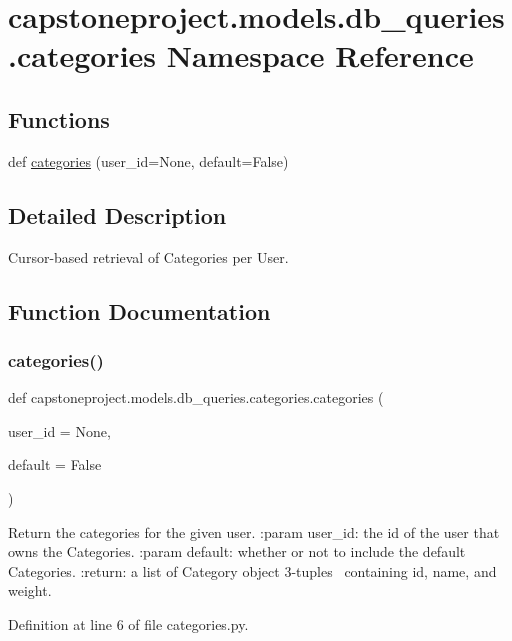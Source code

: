 \hypertarget{namespacecapstoneproject_1_1models_1_1db__queries_1_1categories}{}\section{capstoneproject.\+models.\+db\+\_\+queries.\+categories Namespace Reference}
\label{namespacecapstoneproject_1_1models_1_1db__queries_1_1categories}
\subsection*{Functions}
\begin{DoxyCompactItemize}
\item 
def \mbox{\hyperlink{namespacecapstoneproject_1_1models_1_1db__queries_1_1categories_ae9c91142ad827e3ab30b69c51e7535c9}{categories}} (user\+\_\+id=None, default=False)
\end{DoxyCompactItemize}


\subsection{Detailed Description}
\begin{DoxyVerb}Cursor-based retrieval of Categories per User.\end{DoxyVerb}
 

\subsection{Function Documentation}
\mbox{\label{namespacecapstoneproject_1_1models_1_1db__queries_1_1categories_ae9c91142ad827e3ab30b69c51e7535c9}} 
\subsubsection{\texorpdfstring{categories()}{categories()}}
{\footnotesize\ttfamily def capstoneproject.\+models.\+db\+\_\+queries.\+categories.\+categories (\begin{DoxyParamCaption}\item[{}]{user\+\_\+id = {\ttfamily None},  }\item[{}]{default = {\ttfamily False} }\end{DoxyParamCaption})}

\begin{DoxyVerb}Return the categories for the given user.
:param user_id: the id of the user that owns the Categories.
:param default: whether or not to include the default Categories.
:return: a list of Category object 3-tuples \
containing id, name, and weight.
\end{DoxyVerb}
 

Definition at line 6 of file categories.\+py.

